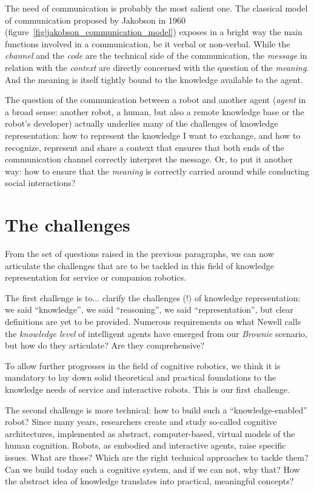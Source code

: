 The need of communication is probably the most salient one. The classical model
of communication proposed by Jakobson in 1960
(figure~\ref{fig|jakobson_communication_model}) exposes in a bright way the
main functions involved in a communication, be it verbal or non-verbal. While
the \emph{channel} and the \emph{code} are the technical side of the
communication, the \emph{message} in relation with the \emph{context} are
directly concerned with the question of the \emph{meaning}. And the meaning is
itself tightly bound to the knowledge available to the agent.

The question of the communication between a robot and another agent
(\emph{agent} in a broad sense: another robot, a human, but also a remote
knowledge base or the robot's developer) actually underlies many of the
challenges of knowledge representation: how to represent the knowledge I want
to exchange, and how to recognize, represent and share a context that ensures
that both ends of the communication channel correctly interpret the message.
Or, to put it another way: how to ensure that the \emph{meaning} is correctly
carried around while conducting social interactions?


\section{The challenges}
\label{sect|challenges}

From the set of questions raised in the previous paragraphs, we can now
articulate the challenges that are to be tackled in this field of knowledge
representation for service or companion robotics.

The first challenge is to... clarify the challenges (!) of knowledge
representation: we said ``knowledge'', we said ``reasoning'', we said
``representation'', but clear definitions are yet to be provided. Numerous
requirements on what Newell calls the \emph{knowledge level} of intelligent
agents have emerged from our \emph{Brownie} scenario, but how do they
articulate? Are they comprehensive?

To allow further progresses in the field of cognitive robotics, we think
it is mandatory to lay down solid theoretical and practical foundations to the
knowledge needs of service and interactive robots. This is our first challenge.

The second challenge is more technical: how to build such a
``knowledge-enabled'' robot? Since many years, researchers create and study
so-called cognitive architectures, implemented as abstract, computer-based,
virtual models of the human cognition. Robots, as embodied and interactive
agents, raise specific issues. What are those? Which are the right technical
approaches to tackle them? Can we build today such a cognitive system, and if
we can not, why that? How the abstract idea of knowledge translates into
practical, meaningful concepts?

